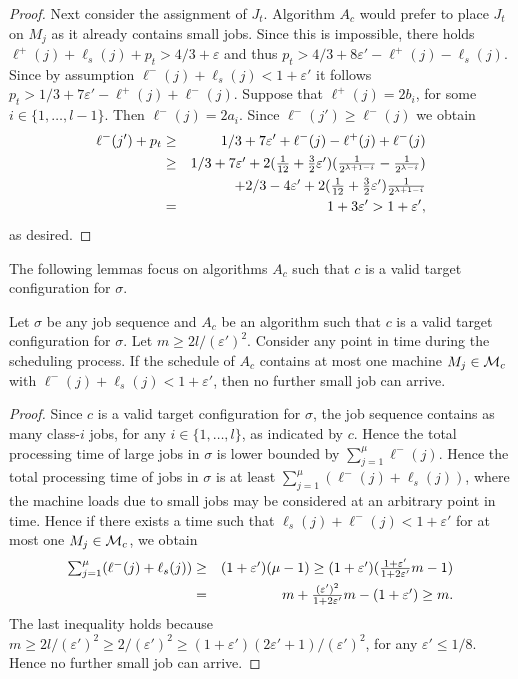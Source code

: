 \documentclass{llncs}
\newcommand{\eps}{\varepsilon}
\begin{document}
\begin{proof}
Next consider the assignment of $J_t$. Algorithm $A_c$ would prefer to place $J_t$ on $M_j$ as it already
contains small jobs. Since this is impossible, there holds $\ell^+(j) + \ell_s(j) +p_t > 4/3+\eps$ and thus
$p_t > 4/3+ 8\eps' - \ell^+(j) - \ell_s(j)$. Since by assumption $\ell^-(j) + \ell_s(j) <1+\eps'$ it follows
$p_t > 1/3 + 7\eps' - \ell^+(j) + \ell^-(j)$. Suppose that $\ell^+(j) = 2b_i$, for some 
$i\in \{1,\ldots, l-1\}$. Then $\ell^-(j) = 2a_i$. Since $\ell^-(j') \geq \ell^-(j)$ we obtain
\begin{eqnarray*}
\ell^-(j') +p_t &\geq& 1/3 + 7\eps' + \ell^-(j) - \ell^+(j) + \ell^-(j)\\
& \geq & {\textstyle 1/3 + 7\eps' + 2({1\over 12} + {3\over 2}\eps')({1\over 2^{\lambda+1-i}} - {1\over 2^{\lambda-i}})}\\
& & {\textstyle +2/3 - 4\eps' +  2({1\over 12} + {3\over 2}\eps'){1\over 2^{\lambda+1-i}}}\\
& = & 1 + 3\eps' > 1+\eps',
\end{eqnarray*}
as desired. \hspace*{\fill}{$\Box$}
\end{proof}

The following lemmas focus on algorithms $A_c$ such that $c$ is a valid target configuration for $\sigma$.
\begin{lemma}\label{lem:sched2}
Let $\sigma$ be any job sequence and $A_c$ be an algorithm such that $c$ is a valid target configuration for
$\sigma$. Let $m \geq 2l/(\eps')^2$. Consider any point in time during the scheduling process. If the
schedule of $A_c$ contains at most one machine $M_j\in {\cal M}_c$ with $\ell^-(j)+\ell_s(j) < 1+\eps'$, then
no further small job can arrive. 
\end{lemma}
\begin{proof}
Since $c$ is a valid target configuration for $\sigma$, the job sequence contains as many class-$i$ jobs,
for any $i\in \{1,\ldots, l\}$, as indicated by $c$. Hence the total processing time of large jobs in 
$\sigma$ is lower bounded by $\sum_{j=1}^{\mu} \ell^-(j)$. Hence the total processing time of jobs in
$\sigma$ is at least $\sum_{j=1}^{\mu} (\ell^-(j) + \ell_s(j))$, where the machine loads due to small
jobs may be considered at an arbitrary point in time. Hence if there exists a time such that 
$\ell_s(j) + \ell^-(j) < 1+\eps'$ for at most one $M_j \in {\cal M}_c$, we obtain
\begin{eqnarray*}
{\textstyle \sum_{j=1}^{\mu} (\ell^-(j) + \ell_s(j))} & \geq & 
\textstyle{(1+\eps')(\mu-1) \geq (1+\eps') ({1+\eps' \over 1+2\eps'} m -1)}\\
& = & {\textstyle m + {(\eps')^2\over1+2\eps'} m - (1+\eps') \geq m.}
\end{eqnarray*}
The last inequality holds because $m \geq 2l/(\eps')^2 \geq 2/(\eps')^2 \geq (1+\eps')(2\eps'+1)/(\eps')^2$,
for any $\eps' \leq 1/8$. Hence no further small job can arrive. \hspace*{\fill}{$\Box$}
\end{proof}
\end{document}
